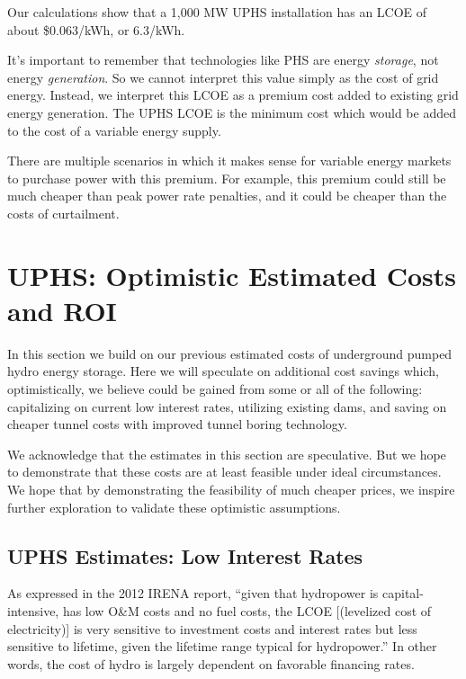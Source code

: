 \documentclass[hidelinks,12pt,a4paper]{article}
\begin{document}
\begin{displayquote}
Our calculations show that a 1,000 MW UPHS installation has an LCOE of about \$0.063/kWh, or 6.3\cent/kWh.
\end{displayquote}

It's important to remember that technologies like PHS are energy \textit{storage}, not energy \textit{generation}. So we cannot interpret this value simply as the cost of grid energy. Instead, we interpret this LCOE as a premium cost added to existing grid energy generation. The UPHS LCOE is the minimum cost which would be added to the cost of a variable energy supply.

There are multiple scenarios in which it makes sense for variable energy markets to purchase power with this premium. For example, this premium could still be much cheaper than peak power rate penalties, and it could be cheaper than the costs of curtailment.


\pagebreak[4]
\section{UPHS: Optimistic Estimated Costs and ROI}
In this section we build on our previous estimated costs of underground pumped hydro energy storage. Here we will speculate on additional cost savings which, optimistically, we believe could be gained from some or all of the following: capitalizing on current low interest rates, utilizing existing dams, and saving on cheaper tunnel costs with improved tunnel boring technology.

We acknowledge that the estimates in this section are speculative. But we hope to demonstrate that these costs are at least feasible under ideal circumstances. We hope that by demonstrating the feasibility of much cheaper prices, we inspire further exploration to validate these optimistic assumptions.

\subsection{UPHS Estimates: Low Interest Rates}
As expressed in the 2012 IRENA report, “given that hydropower is capital-intensive, has low O\&M costs and no fuel costs, the LCOE [(levelized cost of electricity)] is very sensitive to investment costs and interest rates but less sensitive to lifetime, given the lifetime range typical for hydropower.” \cite{RenewableEnergyTechnologiesCostAnalysisSeries} In other words, the cost of hydro is largely dependent on favorable financing rates.
\end{document}
